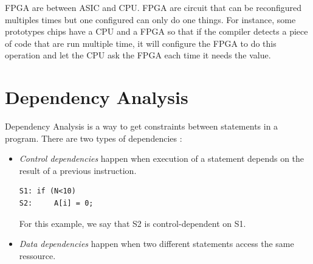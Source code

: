 \ac{FPGA} are between \ac{ASIC} and \ac{CPU}. \ac{FPGA} are circuit that can be reconfigured multiples times but one configured can only do one things. For instance, some prototypes chips have a \ac{CPU} and a \ac{FPGA} so that if the compiler detects a piece of code that are run multiple time, it will configure the \ac{FPGA} to do this operation and let the \ac{CPU} ask the \ac{FPGA} each time it needs the value.  

\section{Dependency Analysis}
Dependency Analysis is a way to get constraints between statements in a program. There are two types of dependencies :
\begin{itemize}
\item \emph{Control dependencies} happen when execution of a statement depends on the result of a previous instruction. 
\begin{lstlisting}[frame=single]
S1: if (N<10)
S2:     A[i] = 0;
\end{lstlisting}

For this example, we say that S2 is control-dependent on S1.

\item \emph{Data dependencies} happen when two different statements access the same ressource.
\end{itemize}

